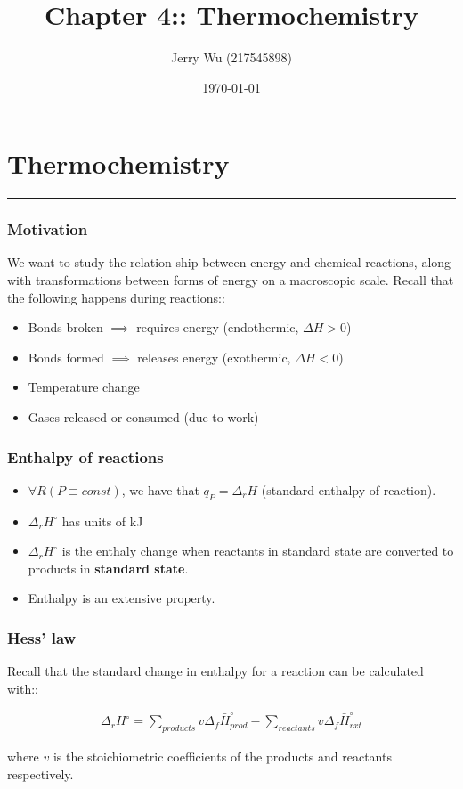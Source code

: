 \documentclass[12pt]{book}
\title{Chapter 4:: Thermochemistry}
\author{Jerry Wu (217545898)}
\date{\today}
\begin{document}
\maketitle
\chapter*{Thermochemistry}
\rule{\textwidth}{0.4pt}

\subsection*{Motivation}
We want to study the relation ship between energy and chemical reactions, along with transformations between forms of energy on a macroscopic scale. Recall that the following happens during reactions::

\begin{itemize}
    \item Bonds broken $\implies$ requires energy (endothermic, $\Delta H>0$)
    \item Bonds formed $\implies$ releases energy (exothermic, $\Delta H<0$)
    \item Temperature change
    \item Gases released or consumed (due to work)
\end{itemize}

\subsection*{Enthalpy of reactions}
\begin{itemize}
    \item $\forall R(P\equiv const)$, we have that $q_P=\Delta_r H$ (standard enthalpy of reaction).
    \item $\Delta_r H^{\circ}$ has units of kJ
    \item $\Delta_r H^{\circ}$ is the enthaly change when reactants in standard state are converted to products in \textbf{standard state}.
    \item Enthalpy is an extensive property.
\end{itemize}

\subsection*{Hess' law}

Recall that the standard change in enthalpy for a reaction can be calculated with::

\begin{align*}
    \Delta_r H^{\circ}=\sum_{products} v\Delta_f \bar{H}^{\circ}_{prod}-\sum_{reactants} v\Delta_f \bar{H}^{\circ}_{rxt}
\end{align*}

where $v$ is the stoichiometric coefficients of the products and reactants respectively.
\end{document}
